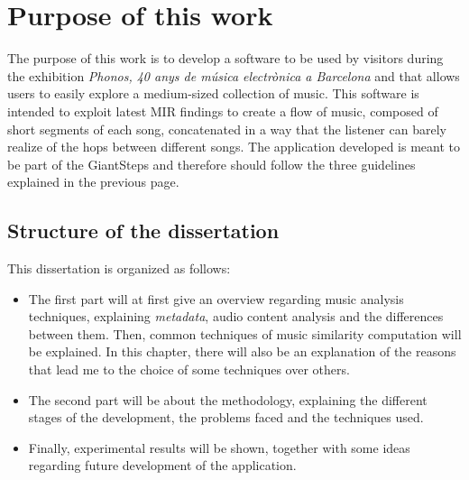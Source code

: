 \section{Purpose of this work}
The purpose of this work is to develop a software to be used by visitors during the exhibition \textit{Phonos, 40 anys de música electrònica a Barcelona} and that allows users to easily explore a medium-sized collection of music. This software is intended to exploit latest MIR findings to create a flow of music, composed of short segments of each song, concatenated in a way that the listener can barely realize of the hops between different songs. The application developed is meant to be part of the GiantSteps and therefore should follow the three guidelines explained in the previous page.

\subsection{Structure of the dissertation}
This dissertation is organized as follows:
\begin{itemize}
\item The first part will at first give an overview regarding music analysis techniques, explaining \textit{metadata}, audio content analysis and the differences between them. Then, common techniques of music similarity computation will be explained. In this chapter, there will also be an explanation of the reasons that lead me to the choice of some techniques over others.
\item The second part will be about the methodology, explaining the different stages of the development, the problems faced and the techniques used.
\item Finally, experimental results will be shown, together with some ideas regarding future development of the application.
\end{itemize}


\newpage
\thispagestyle{headings}
\mbox{}